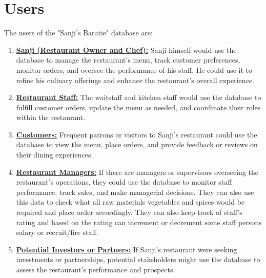 \section{Users} \label{cap:model}


The users of the "Sanji's Baratie" database are:
\begin{enumerate}
    \item \underline{\textbf{Sanji (Restaurant Owner and Chef):}} Sanji himself would use the database to manage the restaurant's menu, track customer preferences, monitor orders, and oversee the performance of his staff. He could use it to refine his culinary offerings and enhance the restaurant's overall experience.
    \item \underline{\textbf{Restaurant Staff:}} The waitstaff and kitchen staff would use the database to fulfill customer orders, update the menu as needed, and coordinate their roles within the restaurant.
    \item \underline{\textbf{Customers:}} Frequent patrons or visitors to Sanji's restaurant could use the database to view the menu, place orders, and provide feedback or reviews on their dining experiences.
    \item \underline{\textbf{Restaurant Managers:}} If there are managers or supervisors overseeing the restaurant's operations, they could use the database to monitor staff performance, track sales, and make managerial decisions. They can also use this data to check what all raw materials vegetables and spices would be required and place order accordingly. They can also keep track of staff's rating and based on the rating can increment or decrement some staff persons salary or recruit/fire staff.
    \item \underline{\textbf{Potential Investors or Partners:}} If Sanji's restaurant were seeking investments or partnerships, potential stakeholders might use the database to assess the restaurant's performance and prospects.
\end{enumerate}